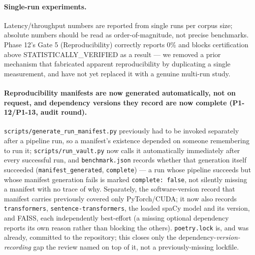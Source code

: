 \paragraph{Single-run experiments.} Latency/throughput numbers are
reported from single runs per corpus size; absolute numbers should be
read as order-of-magnitude, not precise benchmarks. Phase 12's Gate 5
(Reproducibility) correctly reports 0\% and blocks certification above
STATISTICALLY\_VERIFIED as a result --- we removed a prior mechanism that
fabricated apparent reproducibility by duplicating a single measurement,
and have not yet replaced it with a genuine multi-run study.

\paragraph{Reproducibility manifests are now generated automatically,
not on request, and dependency versions they record are now complete
(P1-12/P1-13, audit round).} \texttt{scripts/generate\_run\_manifest.py}
previously had to be invoked separately after a pipeline run, so a
manifest's existence depended on someone remembering to run it;
\texttt{scripts/run\_vault.py} now calls it automatically immediately
after every successful run, and \texttt{benchmark.json} records whether
that generation itself succeeded (\texttt{manifest\_generated},
\texttt{complete}) --- a run whose pipeline succeeds but whose manifest
generation fails is marked \texttt{complete: false}, not silently missing
a manifest with no trace of why. Separately, the software-version record
that manifest carries previously covered only PyTorch/CUDA; it now also
records \texttt{transformers}, \texttt{sentence-transformers}, the loaded
spaCy model and its version, and FAISS, each independently best-effort
(a missing optional dependency reports its own reason rather than
blocking the others). \texttt{poetry.lock} is, and was already, committed
to the repository; this closes only the dependency-\emph{version-recording}
gap the review named on top of it, not a previously-missing lockfile.

